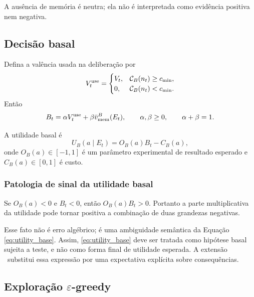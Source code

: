 A ausência de memória é neutra; ela não é interpretada como evidência positiva nem negativa.

\subsection{Decisão basal}

Defina a valência usada na deliberação por
\begin{equation}
V_t^{\rm use}=
\begin{cases}
V_t, & \mathcal C_B(n_t)\ge c_{\min},\\
0, & \mathcal C_B(n_t)<c_{\min}.
\end{cases}
\end{equation}
Então
\begin{equation}
B_t=\alpha V_t^{\rm use}+\beta\bar v_{\rm mem}^{B}(E_t),
\qquad \alpha,\beta\ge0,
\qquad \alpha+\beta=1.
\label{eq:integrated_base}
\end{equation}

A utilidade basal é
\begin{equation}
U_B(a\mid E_t)=O_B(a)B_t-C_B(a),
\label{eq:utility_base}
\end{equation}
onde \(O_B(a)\in[-1,1]\) é um parâmetro experimental de resultado esperado e \(C_B(a)\in[0,1]\) é custo.

\subsubsection*{Patologia de sinal da utilidade basal}

\begin{proposition}
Se \(O_B(a)<0\) e \(B_t<0\), então \(O_B(a)B_t>0\). Portanto a parte multiplicativa da utilidade pode tornar positiva a combinação de duas grandezas negativas.
\end{proposition}

Esse fato não é erro algébrico; é uma ambiguidade semântica da Equação \eqref{eq:utility_base}. Assim, \eqref{eq:utility_base} deve ser tratada como hipótese basal sujeita a teste, e não como forma final de utilidade esperada. A extensão \EVPM\ substitui essa expressão por uma expectativa explícita sobre consequências.

\subsection{Exploração \texorpdfstring{$\varepsilon$}{epsilon}-greedy}

